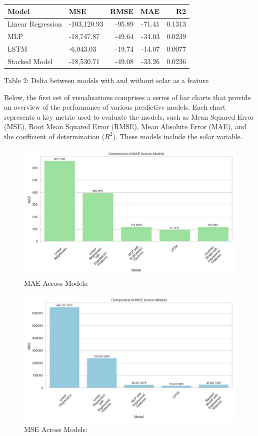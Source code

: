 \documentclass[
]{article}
\begin{document}
\begin{longtable}[]{@{}llrrr@{}}
\toprule\noalign{}
Model & MSE & RMSE & MAE & R2 \\
\midrule\noalign{}
\endhead
\bottomrule\noalign{}
\endlastfoot
Linear Regression & -103,120.93 & -95.89 & -71.41 & 0.1313 \\
MLP & -18,747.87 & -49.64 & -34.03 & 0.0239 \\
LSTM & -6,043.03 & -19.74 & -14.07 & 0.0077 \\
Stacked Model & -18,530.71 & -49.08 & -33.26 & 0.0236 \\
\end{longtable}

Table 2: Delta between models with and without solar as a feature

Below, the first set of visualisations comprises a series of bar charts
that provide an overview of the performance of various predictive
models. Each chart represents a key metric used to evaluate the models,
such as Mean Squared Error (MSE), Root Mean Squared Error (RMSE), Mean
Absolute Error (MAE), and the coefficient of determination (\(R^2\)).
These models include the solar variable.

\begin{figure}
\centering
\includegraphics{img/mae_comparison_across_models.jpg}
\caption{MAE Across Models:}
\end{figure}

\begin{figure}
\centering
\includegraphics{img/mse_comparison_across_models.jpg}
\caption{MSE Across Models:}
\end{figure}
\end{document}
